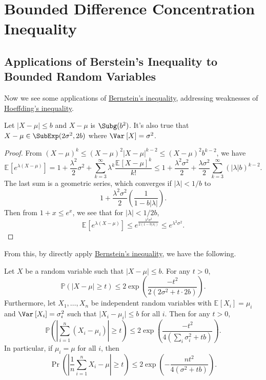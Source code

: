 \section{Bounded Difference Concentration Inequality}
\subsection{Applications of Berstein's Inequality to Bounded Random Variables}
Now we see some applications of \hyperref[thm:Bernstein-inequality]{Bernstein's inequality}, addressing weaknesses of \hyperref[thm:Hoeffding-inequality]{Hoeffding's inequality}.

\begin{lemma}\label{lma:Bernstein-inequality-for-bounded-random-variable}
	Let \(\vert X - \mu \vert \leq b\) and \(X - \mu \) is \(\Subg(b^2) \). It's also true that \(X - \mu \in \SubExp(2 \sigma ^{2} , 2b) \) where \(\Var_{}\left[X \right] = \sigma ^{2} \).
\end{lemma}
\begin{proof}
	From \((X - \mu )^k \leq (X - \mu )^2 \vert X - \mu \vert ^{k - 2} \leq (X - \mu )^2 b^{k-2}\), we have
	\[
		\mathbb{E}_{}\left[e^{\lambda (X - \mu )} \right]
		= 1 + \frac{\lambda ^{2} }{2} \sigma ^{2} + \sum_{k=3}^{\infty} \lambda ^k \frac{\mathbb{E}_{}\left[X - \mu  \right] ^k}{k!}
		\leq 1 + \frac{\lambda ^2 \sigma ^2}{2} + \frac{\lambda \sigma ^2}{2} \sum_{k=3}^{\infty} (\vert \lambda  \vert b)^{k - 2}.
	\]
	The last sum is a geometric series, which converges if \(\vert \lambda  \vert < 1 / b\) to
	\[
		1 + \frac{\lambda ^2 \sigma ^2}{2} \left( \frac{1}{1 - b \vert \lambda \vert } \right) .
	\]
	Then from \(1 + x \leq e^x\), we see that for \(\vert \lambda \vert < 1/2b\),
	\[
		\mathbb{E}_{}\left[e^{\lambda (X - \mu )} \right]
		\leq e^{\frac{\lambda ^2 \sigma ^{2} }{2(1 - b \vert \lambda \vert )}}
		\leq e^{\lambda ^{2} \sigma ^{2} }.
	\]
\end{proof}

From this, by directly apply \hyperref[thm:Bernstein-inequality]{Bernstein's inequality}, we have the following.

\begin{corollary}\label{col:Bernstein-inequality-for-bounded-random-variable*}
	Let \(X\) be a random variable such that \(\vert X - \mu \vert \leq b\). For any \(t > 0\),
	\[
		\mathbb{P} (\vert X - \mu  \vert \geq t) \leq 2 \exp \left( \frac{- t^2}{2(2\sigma ^{2} + t\cdot 2b)} \right).
	\]
	Furthermore, let \(X_1, \dots , X_n\) be independent random variables with \(\mathbb{E}_{}\left[X_i \right] = \mu _i\) and \(\Var_{}\left[X_i \right] = \sigma _i^{2}\) such that \(\vert X_i - \mu _i \vert \leq b\) for all \(i\). Then for any \(t > 0\),
	\[
		\mathbb{P} \left( \left\vert \sum_{i=1}^n (X_i - \mu _i) \right\vert \geq t \right) \leq 2 \exp \left( \frac{-t^2}{4\left( \sum_{i} \sigma _i^2 + tb\right) } \right).
	\]
	In particular, if \(\mu _i = \mu \) for all \(i\), then
	\[
		\Pr_{}\left( \left\vert \frac{1}{n} \sum_{i=1}^{n} X_i - \mu \right\vert \geq t \right)  \leq 2 \exp \left( - \frac{nt^2}{4(\sigma ^{2} + tb)} \right) .
	\]
\end{corollary}

